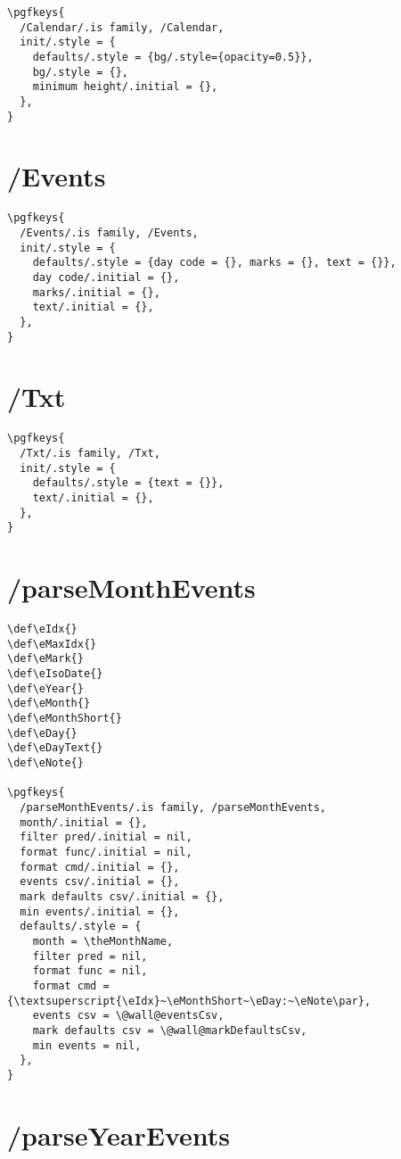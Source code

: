 \documentclass[11pt,oneside]{memoir-article}
\begin{document}
\begin{verbatim}
\pgfkeys{
  /Calendar/.is family, /Calendar,
  init/.style = {
    defaults/.style = {bg/.style={opacity=0.5}},
    bg/.style = {},
    minimum height/.initial = {},
  },
}
\end{verbatim}

\section{/Events}
\label{sec-7-5}

\begin{verbatim}
\pgfkeys{
  /Events/.is family, /Events,
  init/.style = {
    defaults/.style = {day code = {}, marks = {}, text = {}},
    day code/.initial = {},
    marks/.initial = {},
    text/.initial = {},
  },
}
\end{verbatim}

\section{/Txt}
\label{sec-7-6}

\begin{verbatim}
\pgfkeys{
  /Txt/.is family, /Txt,
  init/.style = {
    defaults/.style = {text = {}},
    text/.initial = {},
  },
}
\end{verbatim}

\section{/parseMonthEvents}
\label{sec-7-7}

\begin{verbatim}
\def\eIdx{}
\def\eMaxIdx{}
\def\eMark{}
\def\eIsoDate{}
\def\eYear{}
\def\eMonth{}
\def\eMonthShort{}
\def\eDay{}
\def\eDayText{}
\def\eNote{}

\pgfkeys{
  /parseMonthEvents/.is family, /parseMonthEvents,
  month/.initial = {},
  filter pred/.initial = nil,
  format func/.initial = nil,
  format cmd/.initial = {},
  events csv/.initial = {},
  mark defaults csv/.initial = {},
  min events/.initial = {},
  defaults/.style = {
    month = \theMonthName,
    filter pred = nil,
    format func = nil,
    format cmd = {\textsuperscript{\eIdx}~\eMonthShort~\eDay:~\eNote\par},
    events csv = \@wall@eventsCsv,
    mark defaults csv = \@wall@markDefaultsCsv,
    min events = nil,
  },
}
\end{verbatim}

\section{/parseYearEvents}
\label{sec-7-8}
\end{document}
